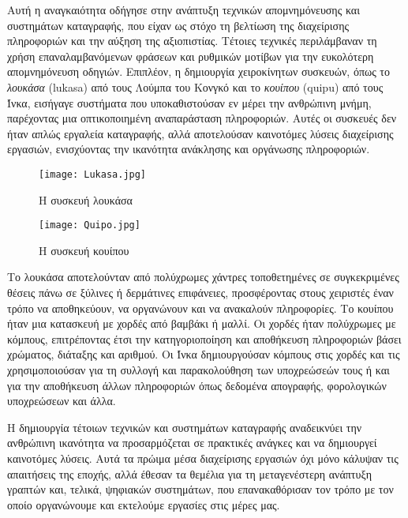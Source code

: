             Αυτή η αναγκαιότητα οδήγησε στην ανάπτυξη τεχνικών απομνημόνευσης και συστημάτων καταγραφής, που είχαν ως στόχο τη βελτίωση της διαχείρισης πληροφοριών και την αύξηση της αξιοπιστίας. Τέτοιες τεχνικές περιλάμβαναν τη χρήση επαναλαμβανόμενων φράσεων και ρυθμικών μοτίβων για την ευκολότερη απομνημόνευση οδηγιών. Επιπλέον, η δημιουργία χειροκίνητων συσκευών, όπως το \textit{λουκάσα} (lukasa) από τους Λούμπα του Κονγκό και το \textit{κουίπου} (quipu) από τους Ίνκα, εισήγαγε συστήματα που υποκαθιστούσαν εν μέρει την ανθρώπινη μνήμη, παρέχοντας μια οπτικοποιημένη αναπαράσταση πληροφοριών. Αυτές οι συσκευές δεν ήταν απλώς εργαλεία καταγραφής, αλλά αποτελούσαν καινοτόμες λύσεις διαχείρισης εργασιών, ενισχύοντας την ικανότητα ανάκλησης και οργάνωσης πληροφοριών.

            \begin{figure}[h!] \noindent \centering
                \texttt{[image: Lukasa.jpg]}
                \caption{Η συσκευή λουκάσα}
            \end{figure}

            \begin{figure}[h!] \noindent \centering
                \texttt{[image: Quipo.jpg]}
                \caption{Η συσκευή κουίπου}
            \end{figure}

            Το λουκάσα αποτελούνταν από πολύχρωμες χάντρες τοποθετημένες σε συγκεκριμένες θέσεις πάνω σε ξύλινες ή δερμάτινες επιφάνειες, προσφέροντας στους χειριστές έναν τρόπο να αποθηκεύουν, να οργανώνουν και να ανακαλούν πληροφορίες. \cite{Lukasa} Το κουίπου ήταν μια κατασκευή με χορδές από βαμβάκι ή μαλλί. Οι χορδές ήταν πολύχρωμες με κόμπους, επιτρέποντας έτσι την κατηγοριοποίηση και αποθήκευση πληροφοριών βάσει χρώματος, διάταξης και αριθμού. Οι Ίνκα δημιουργούσαν κόμπους στις χορδές και τις χρησιμοποιούσαν για τη συλλογή και παρακολούθηση των υποχρεώσεών τους ή και για την αποθήκευση άλλων πληροφοριών όπως δεδομένα απογραφής, φορολογικών υποχρεώσεων και άλλα. \cite{Quipu}

            Η δημιουργία τέτοιων τεχνικών και συστημάτων καταγραφής αναδεικνύει την ανθρώπινη ικανότητα να προσαρμόζεται σε πρακτικές ανάγκες και να δημιουργεί καινοτόμες λύσεις. Αυτά τα πρώιμα μέσα διαχείρισης εργασιών όχι μόνο κάλυψαν τις απαιτήσεις της εποχής, αλλά έθεσαν τα θεμέλια για τη μεταγενέστερη ανάπτυξη γραπτών και, τελικά, ψηφιακών συστημάτων, που επανακαθόρισαν τον τρόπο με τον οποίο οργανώνουμε και εκτελούμε εργασίες στις μέρες μας.

